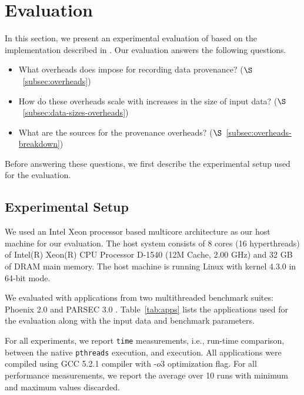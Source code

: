 \section{Evaluation}
\label{sec:evaluation}

In this section, we present an experimental evaluation of \projecttitle based on the implementation described in  . Our evaluation answers the following questions.

\begin{itemize}
\item What overheads does \projecttitle impose for recording data provenance? ($\S$~\ref{subsec:overheads})
\item How do these overheads scale with increases in the size of input data? ($\S$~\ref{subsec:data-sizes-overheads})
\item What are the sources for the provenance overheads? ($\S$~\ref{subsec:overheads-breakdown})
\end{itemize}

Before answering these questions, we first describe the experimental setup used for the evaluation.

\subsection{Experimental Setup}


 We used an Intel Xeon processor based
multicore architecture as our host machine for our evaluation. The
host system consists of 8 cores (16 hyperthreads) of Intel(R) Xeon(R) CPU Processor D-1540
(12M Cache, 2.00 GHz) and 32 GB of DRAM main memory. The host
machine is running Linux with kernel 4.3.0 in 64-bit mode.


  We evaluated \projecttitle with applications from two multithreaded benchmark suites: Phoenix 2.0 \cite{phoenix} and PARSEC 3.0 \cite{parsec}. Table~\ref{tab:apps} lists the applications used for the evaluation along with the input data and benchmark parameters.


  For all experiments,  we report {\tt time} measurements, i.e., run-time comparison, between the native {\tt pthreads} execution, and \projecttitle execution.  All applications were compiled using GCC 5.2.1 compiler with -$o3$ optimization flag. For all performance measurements, we report the average over 10 runs with minimum and maximum values discarded.

